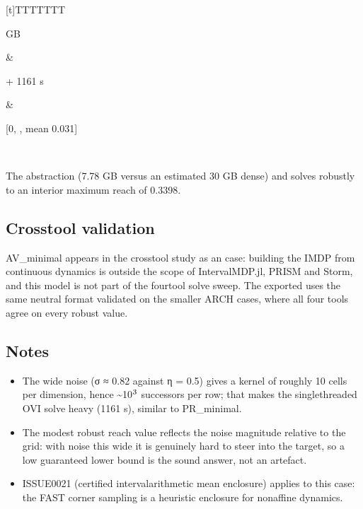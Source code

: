 \documentclass[a4paper,10pt,english]{sphinxmanual}
\begin{document}
\begin{savenotes}
\begin{tabulary}{\linewidth}[t]{TTTTTTT}
\begin{varwidth}[t]{}
 GB
\sphinxbeforeendvarwidth
\end{varwidth}%
&\begin{varwidth}[t]{}
 + 1161 s
\sphinxbeforeendvarwidth
\end{varwidth}%
&\begin{varwidth}[t]{}
\sphinxAtStartPar
{[}0, , mean 0.031{]}
\sphinxbeforeendvarwidth
\end{varwidth}%
\\
\sphinxbottomrule
\end{tabulary}
\sphinxtableafterendhook\par
\sphinxattableend\end{savenotes}

\sphinxAtStartPar
The abstraction  (7.78 GB versus an estimated
30 GB dense) and solves robustly to an interior maximum reach of 0.3398.


\subsection{Cross\sphinxhyphen{}tool validation}
\label{\detokenize{benchmarks/AV_minimal:cross-tool-validation}}
\sphinxAtStartPar
AV\_minimal appears in the cross\sphinxhyphen{}tool study as an  case:
building the IMDP from continuous dynamics is outside the scope of IntervalMDP.jl,
PRISM and Storm, and this model is not part of the four\sphinxhyphen{}tool solve sweep. The
exported  uses the same neutral format validated on the smaller ARCH cases,
where all four tools agree on every robust value.


\subsection{Notes}
\label{\detokenize{benchmarks/AV_minimal:notes}}\begin{itemize}
\item {} 
\sphinxAtStartPar
The wide noise (σ ≈ 0.82 against η = 0.5) gives a kernel of roughly 10 cells per
dimension, hence \textasciitilde{}10\(\sp{\text{3}}\) successors per row; that makes the single\sphinxhyphen{}threaded OVI solve
heavy (1161 s), similar to PR\_minimal.

\item {} 
\sphinxAtStartPar
The modest robust reach value reflects the noise magnitude relative to the grid:
with noise this wide it is genuinely hard to  steer into the target, so
a low guaranteed lower bound is the sound answer, not an artefact.

\item {} 
\sphinxAtStartPar
ISSUE\sphinxhyphen{}0021 (certified interval\sphinxhyphen{}arithmetic mean enclosure) applies to this case: the
FAST corner sampling is a heuristic enclosure for non\sphinxhyphen{}affine dynamics.

\end{itemize}
\end{document}
